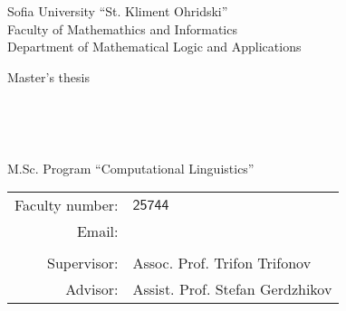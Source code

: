 \documentclass[main.tex]{subfiles}
\begin{document}
\begin{center}
    Sofia University ``St. Kliment Ohridski'' \\
    Faculty of Mathemathics and Informatics \\
    Department of Mathematical Logic and Applications
    \vspace{4cm}

    {\LARGE Master's thesis} \\

    \vspace{1cm}

    {\huge \thetitle} \\

    \vspace{2cm}

    {\LARGE \theauthor} \\

    \vspace{15mm}

    {\large M.Sc. Program ``Computational Linguistics''} \\

    \vspace{3mm}

    \begin{tabular}{r l}
        Faculty number: & $\mathsf{25744}$ \\
        Email: & \code{\theemail} \\

    \vspace{1cm} \\
        \large Supervisor: & \large Assoc. Prof. Trifon Trifonov \\
        \large Advisor: & \large Assist. Prof. Stefan Gerdzhikov \\
    \end{tabular}

    \vspace{4cm}

    {\large \thedate}
\end{center}
\thispagestyle{empty}

\pagebreak
\printtoc
\pagebreak
\end{document}
